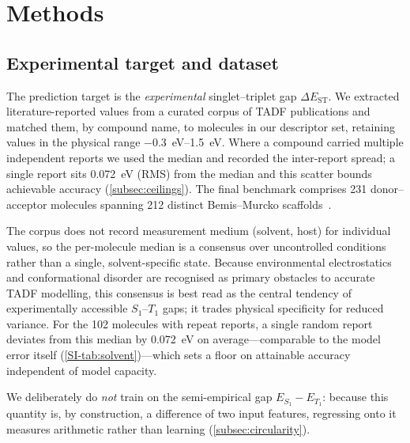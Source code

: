 
\section{Methods}\label{sec:methods}

\subsection{Experimental target and dataset}\label{para:validation_hierarchy}

The prediction target is the \emph{experimental} singlet--triplet gap
$\Delta E_\text{ST}$. We extracted literature-reported values from a curated
corpus of TADF publications and matched them, by compound name, to molecules in
our descriptor set, retaining values in the physical range
\qtyrange{-0.3}{1.5}{\electronvolt}. Where a compound carried multiple independent
reports we used the median and recorded the inter-report spread; a single report sits
\qty{0.072}{\electronvolt} (RMS) from the median and this scatter bounds achievable
accuracy (\cref{subsec:ceilings}). The final benchmark comprises \num{231} donor--acceptor
molecules spanning \num{212} distinct Bemis--Murcko scaffolds~\cite{Bemis1996}.

The corpus does not record measurement medium (solvent, host) for individual
values, so the per-molecule median is a consensus over uncontrolled conditions
rather than a single, solvent-specific state. Because environmental electrostatics
and conformational disorder are recognised as primary obstacles to accurate TADF
modelling,\cite{Olivier2017} this consensus is best read as the central tendency of
experimentally accessible $S_1$--$T_1$ gaps; it trades physical specificity for
reduced variance. For the \num{102} molecules with repeat reports, a single random
report deviates from this median by \qty{0.072}{\electronvolt} on
average---comparable to the model error itself
(\cref{SI-tab:solvent})---which sets a floor on attainable accuracy independent of
model capacity.

We deliberately do \emph{not} train on the semi-empirical gap
$E_{S_1}-E_{T_1}$: because this quantity is, by construction, a difference of two
input features, regressing onto it measures arithmetic rather than learning
(\cref{subsec:circularity}).

